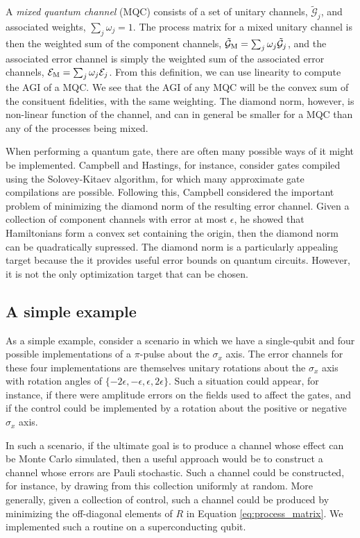 \documentclass[aps,nofootinbib,pra,notitlepage,twocolumn]{revtex4-1}
\newcommand{\actual}{\ensuremath{\tilde{\mathcal{G}}}}
\newcommand{\error}{\ensuremath{{\mathcal{E}}}}
\begin{document}
A \textit{mixed quantum channel} (MQC) consists of a set of unitary channels, $\actual_j$, and associated weights, $\sum_j \omega_j = 1$.  The process matrix for a mixed unitary channel is then the weighted sum of the component channels, $\actual_{\rm M} = \sum_j \omega_j \actual_j$, and the associated error channel is simply the weighted sum of the associated error channels, $\error_{\rm M} = \sum_j \omega_j \error_j$. From this definition, we can use linearity to compute the AGI of a MQC. We see that the AGI of any MQC will be the convex sum of the consituent fidelities, with the same weighting. The diamond norm, however, is non-linear function of the channel, and can in general be smaller for a MQC than any of the processes being mixed. 

When performing a quantum gate, there are often many possible ways of it might be implemented. Campbell and Hastings, for instance, consider gates compiled using the Solovey-Kitaev algorithm, for which many approximate gate compilations are possible.\cite{Campbell2017, 1612.01011} Following this, Campbell considered the important problem of minimizing the diamond norm of the resulting error channel. Given a collection of component channels with error at most $\epsilon$, he showed that Hamiltonians form a convex set containing the origin, then the diamond norm can be quadratically supressed. The diamond norm is a particularly appealing target because the it provides useful error bounds on quantum circuits. However, it is not the only optimization target that can be chosen. 

\subsection{A simple example}
\label{sec:simple_example}
As a simple example, consider a scenario in which we have a single-qubit and four possible implementations of a $\pi$-pulse about the $\sigma_x$ axis. The error channels for these four implementations are themselves unitary rotations about the $\sigma_x$ axis with rotation angles of $\{-2\epsilon, -\epsilon, \epsilon, 2\epsilon\}$. Such a situation could appear, for instance, if there were amplitude errors on the fields used to affect the gates, and if the control could be implemented by a rotation about the positive or negative $\sigma_x$ axis.



In such a scenario, if the ultimate goal is to produce a channel whose effect can be Monte Carlo simulated, then a useful approach would be to construct a channel whose errors are Pauli stochastic. Such a channel could be constructed, for instance, by drawing from this collection uniformly at random. More generally, given a collection of control, such a channel could be produced by minimizing the off-diagonal elements of $R$ in Equation \ref{eq:process_matrix}. We implemented such a routine on a superconducting qubit.
\end{document}
